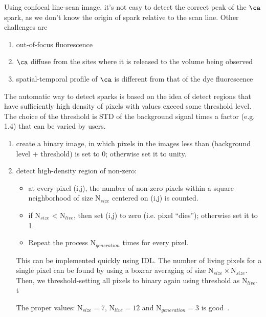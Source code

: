 

Using confocal line-scan image, it's not easy to detect the correct
peak of the $\ca$ spark, as we don't know the origin of spark relative
to the scan line. Other challenges are~\citep{pratusevich1996}
\begin{enumerate}
\item out-of-focus fluorescence
\item $\ca$ diffuse from the sites where it is released to the volume
  being observed
\item spatial-temporal profile of $\ca$ is different from that of the
  dye fluorescence
\end{enumerate}

The automatic way to detect sparks is based on the idea of detect
regions that have sufficiently high density of pixels with values
exceed some threshold level. The choice of the threshold is STD of the
background signal times a factor (e.g. 1.4) that can be varied by
users.
\begin{enumerate}
\item create a binary image, in which pixels in the images less than
  (background level + threshold) is set to 0; otherwise set it to
  unity.
\item detect high-density region of non-zero:
  \begin{itemize}
  \item at every pixel (i,j), the number of non-zero pixels within a
    square neighborhood of size N$_{size}$ centered on (i,j) is
    counted.
  \item if N$_{size}$ < N$_{live}$, then set (i,j) to zero (i.e. pixel
    ``dies''); otherwise set it to 1.
  \item Repeat the process N$_{generation}$ times for every pixel.
  \end{itemize}
  This can be implemented quickly using IDL. The number of living
  pixels for a single pixel can be found by using a boxcar averaging
  of size N$_{size}\times$N$_{size}$. Then, we threshold-setting all
  pixels to binary again using threshold as N$_{live}$. t

  The proper values: N$_{size}=7$, N$_{live}=12$ and
  N$_{generation}=3$ is good~\citep{izu1998}.
\end{enumerate}

